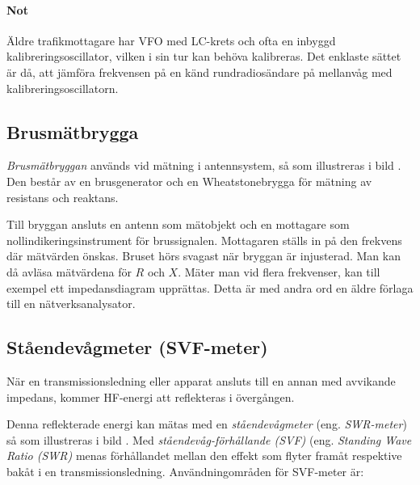 \paragraph{Not}
Äldre trafikmottagare har VFO med LC-krets och ofta en inbyggd
kalibreringsoscillator, vilken i sin tur kan behöva kalibreras.
Det enklaste sättet är då, att jämföra frekvensen på en känd rundradiosändare
på mellanvåg med kalibreringsoscillatorn.

\subsection{Brusmätbrygga}


\emph{Brusmätbryggan} används vid mätning i antennsystem, så som illustreras i
bild .
Den består av en brusgenerator och en Wheatstonebrygga för mätning av
resistans och reaktans.

Till bryggan ansluts en antenn som mätobjekt och en mottagare som
nollindikeringsinstrument för brussignalen.
Mottagaren ställs in på den frekvens där mätvärden önskas.
Bruset hörs svagast när bryggan är injusterad.
Man kan då avläsa mätvärdena för \(R\) och \(X\).
Mäter man vid flera frekvenser, kan till exempel ett impedansdiagram upprättas.
Detta är med andra ord en äldre förlaga till en nätverksanalysator.

\subsection{Ståendevågmeter (SVF-meter)}
\label{SVF}


När en transmissionsledning eller apparat ansluts till en annan med
avvikande impedans, kommer HF-energi att reflekteras i övergången.

Denna reflekterade energi kan mätas med en \emph{ståendevågmeter}
(eng. \emph{SWR-meter}) så som illustreras i bild .
Med \emph{ståendevåg-förhållande (SVF)} (eng. \emph{Standing Wave Ratio (SWR)}
menas förhållandet mellan den effekt som flyter framåt respektive bakåt i en
transmissionsledning.
Användningområden för SVF-meter är:


